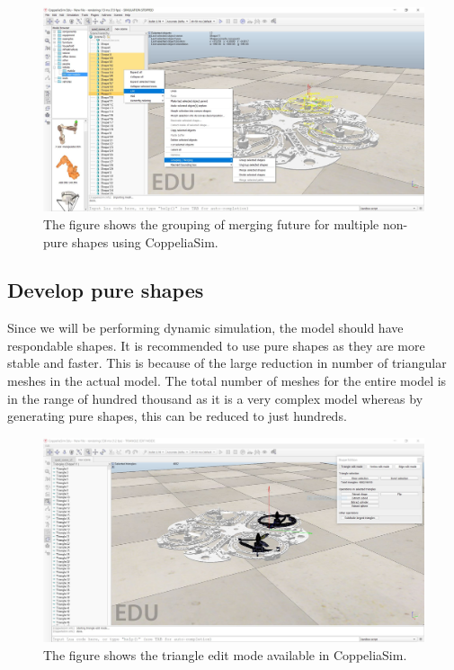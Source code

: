 \documentclass[a4paper, 12pt, oneside]{book}
\begin{document}
\begin{figure}[H]
    \begin{center}
        \includegraphics[width=.95\linewidth]{figures/merging_step.JPG}
        \caption{The figure shows the grouping of merging future for multiple non-pure shapes using CoppeliaSim.}
        \label{fig:merge}
    \end{center}
\end{figure}

\subsection{Develop pure shapes}
Since we will be performing dynamic simulation, the model should have respondable shapes. It is recommended to use pure shapes as they are more stable and faster. This is because of the large reduction in number of triangular meshes in the actual model. The total number of meshes for the entire model is in the range of hundred thousand as it is a very complex model whereas by generating pure shapes, this can be reduced to just hundreds. \\

\begin{figure}[H]
    \begin{center}
        \includegraphics[width=.95\linewidth]{figures/extractShape.JPG}
        \caption{The figure shows the triangle edit mode available in CoppeliaSim.}
        \label{fig:extractShape}
    \end{center}
\end{figure}
\end{document}
